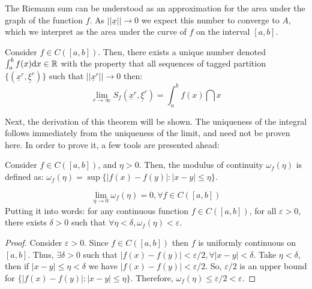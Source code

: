 The Riemann sum can be understood as an approximation for the area under the graph of the function $f$. As $||\underline{x}|| \to 0$ we expect this number to converge to $A$, which we interpret as the area under the curve of $f$ on the interval $[a,b]$.

\newpage

\begin{theorem}
    Consider $f \in C([a,b])$. Then, there exists a unique number denoted $\int_{a}^b f(x)\text{d} x \in \mathbb{R}$ with the property that all sequences of tagged partition $\{(\underline{x}^r, \underline{\xi}^r)\}$ such that $||\underline{x}^r|| \to 0$ then:
    \begin{equation}
        \lim \limits_{r \to \infty} S_f(\underline{x}^r, \underline{\xi}^r) = \int_{a}^b f(x) \dint x
    \end{equation}
\end{theorem}

Next, the derivation of this theorem will be shown. The uniqueness of the integral follows immediately from the uniqueness of the limit, and need not be proven here. In order to prove it, a few tools are presented ahead:

\begin{definition}
    Consider $f \in C([a,b])$, and $\eta >0$. Then, the modulus of continuity $\omega_f(\eta)$ is defined as: $\omega_f(\eta) = \sup \{|f(x) - f(y)|:|x-y| \leq \eta\}$.
\end{definition}

\begin{theorem}[Theorem I]
    \begin{equation}
        \lim \limits_{\eta \to 0} \omega_f(\eta) = 0, \forall f \in C([a,b])
    \end{equation}
    Putting it into words: for any continuous function $f \in C([a,b])$, for all $\varepsilon > 0$, there exists $\delta > 0$ such that $\forall \eta < \delta, \omega_f(\eta)<\varepsilon$.
\end{theorem}

\begin{proof}
    Consider $\varepsilon > 0$. Since $f \in C([a,b])$ then $f$ is uniformly continuous on $[a,b]$. Thus, $\exists \delta > 0$ such that $|f(x) - f(y)| < \varepsilon/2, \forall |x-y| < \delta$. Take $\eta < \delta$, then if $|x-y| \leq \eta < \delta$ we have $|f(x) - f(y)| < \varepsilon/2$. So, $\varepsilon/2$ is an upper bound for $\{|f(x) - f(y)|:|x-y|\leq \eta\}$. Therefore, $\omega_f(\eta) \leq \varepsilon/2 < \varepsilon$.
\end{proof}

